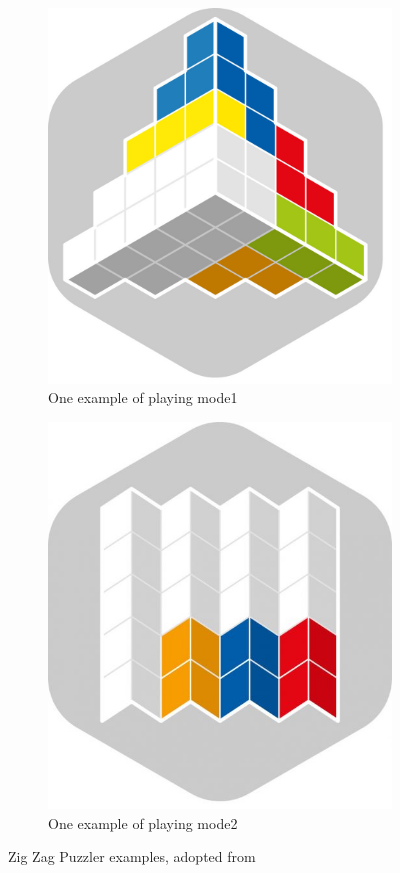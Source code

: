 \begin{figure}[htbp]
\begin{subfigure}[b]{0.32\textwidth}
    \includegraphics[width=\textwidth]{figs/zig_zag_mode1.jpg}
    \caption{One example of playing mode1}
    \end{subfigure}
    \begin{subfigure}[b]{0.32\textwidth}
    \includegraphics[width=\textwidth]{figs/zig_zag_mode2.jpg}
    \caption{One example of playing mode2}
    \end{subfigure}
    \caption{Zig Zag Puzzler examples, adopted from~\cite{r23}}
    \label{fig:ZIG_ZAG_Puzzler_playing_modes}
\end{figure}
